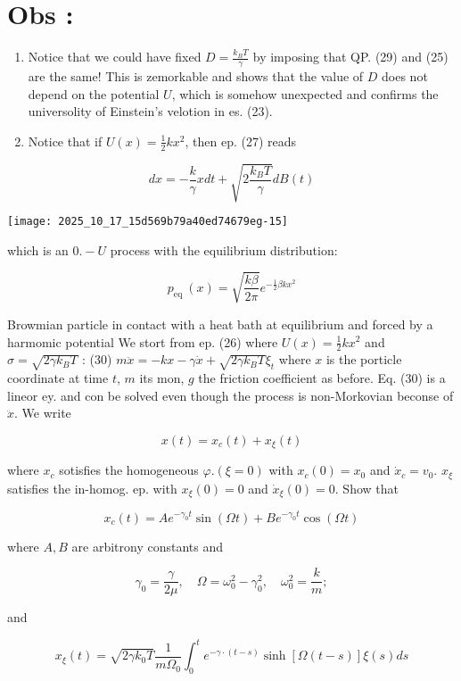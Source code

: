 \section*{Obs :}
\begin{enumerate}
  \item Notice that we could have fixed $D=\frac{k_{B} T}{\gamma}$ by imposing that QP. (29) and (25) are the same! This is zemorkable and shows that the value of $D$ does not depend on the potential $U$, which is somehow unexpected and confirms the universolity of Einstein's velotion in es. (23).
  \item Notice that if $U(x)=\frac{1}{2} k x^{2}$, then ep. (27) reads
\end{enumerate}

$$ d x=-\frac{k}{\gamma} x d t+\sqrt{2 \frac{k_{B} T}{\gamma}} d B(t) $$

\begin{center}
\texttt{[image: 2025\_10\_17\_15d569b79a40ed74679eg-15]}
\end{center}
which is an $0 .-U$ process with the equilibrium distribution:

$$ p_{\text {eq }}(x)=\sqrt{\frac{k \beta}{2 \pi}} e^{-\frac{1}{2} \beta k x^{2}} $$

Browmian particle in contact with a heat bath at equilibrium and forced by a harmomic potential We stort from ep. (26) where $U(x)=\frac{1}{2} k x^{2}$ and $\sigma=\sqrt{2 \gamma k_{B} T}$ :
(30) $m \ddot{x}=-k x-\gamma \dot{x}+\sqrt{2 \gamma k_{B} T} \xi_{t}$
where $x$ is the porticle coordinate at time $t$, $m$ its mon, $g$ the friction coefficient as before.
Eq. (30) is a lineor ey. and con be solved even though the process is non-Morkovian beconse of $\ddot{x}$. We write

$$ x(t)=x_{c}(t)+x_{\xi}(t) $$

where $x_{c}$ sotisfies the homogeneous $\varphi .( \xi=0)$ with $x_{c}(0)=x_{0}$ and $\dot{x}_{c}=v_{0}$. $x_{\xi}$ satisfies the in-homog. ep. with $x_{\xi}(0)=0$ and $\dot{x}_{\xi}(0)=0$.
Show that

$$ x_{c}(t)=A e^{-\gamma_{0} t} \sin (\Omega t)+B e^{-\gamma_{0} t} \cos (\Omega t) $$

where $A, B$ are arbitrony constants and

$$ \gamma_{0}=\frac{\gamma}{2 \mu}, \quad \Omega=\omega_{0}^{2}-\gamma_{0}^{2}, \quad \omega_{0}^{2}=\frac{k}{m} ;
$$ 

and

$$ x_{\xi}(t)=\sqrt{2 \gamma k_{0} T} \frac{1}{m \Omega_{0}} \int_{0}^{t} e^{-\gamma \cdot(t-s)} \sinh [\Omega(t-s)] \xi(s) d s $$

